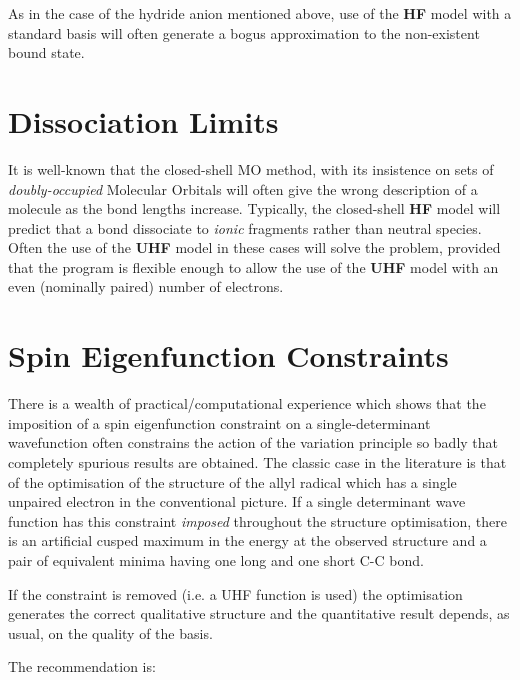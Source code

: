 As in the case of the hydride anion mentioned above, use of the {\bf HF}
model with a standard basis will often generate a bogus approximation
to the non-existent bound state.
\section{\sf Dissociation Limits}
It is well-known that the closed-shell MO method, with its
insistence on sets of {\em doubly-occupied} Molecular Orbitals will
often give the wrong description of a molecule as the bond lengths
increase. Typically, the closed-shell {\bf HF} model will predict
that a bond dissociate to {\em ionic} fragments  rather than
neutral species. Often the use of the {\bf UHF} model in these cases
will solve the problem, provided that the program is flexible enough
to allow the use of the {\bf UHF} model with an even (nominally
paired) number of electrons.
\section{\sf Spin Eigenfunction Constraints}
There is a wealth of practical/computational experience which shows
that the imposition of a spin eigenfunction constraint on a
single-determinant wavefunction often constrains the action of the
variation principle so badly that completely spurious results are
obtained. 
The classic case in the literature is that of the 
optimisation of the structure of the allyl radical which has
a single unpaired electron in the conventional picture.
If a single determinant wave function has this constraint {\em imposed}
throughout the structure optimisation, there is an artificial
cusped maximum in the energy at the observed structure and a pair of
equivalent minima having one long and one short C-C bond. 

If the constraint is removed (i.e. a UHF function is used) the
optimisation generates the correct qualitative structure and the quantitative
result depends, as usual, on the quality of the basis.

The recommendation is:
\begin{center}
\end{center}


